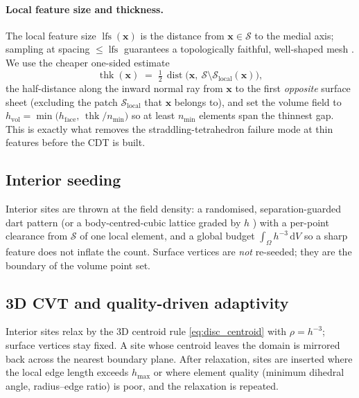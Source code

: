 \documentclass[11pt,a4paper]{article}
\numberwithin{equation}{section}
\newcommand{\vv}[1]{\mathbf{#1}}
\newcommand{\dd}{\,\mathrm{d}}
\DeclareMathOperator{\dist}{dist}
\begin{document}
\paragraph{Local feature size and thickness.}
The local feature size $\operatorname{lfs}(\vv{x})$ is the distance from
$\vv{x}\in\mathcal{S}$ to the medial axis; sampling at spacing
$\le\operatorname{lfs}$ guarantees a topologically faithful, well-shaped mesh
\cite{BoissonnatOudot2005}. We use the cheaper one-sided estimate
\begin{equation}
\label{eq:thickness}
\operatorname{thk}(\vv{x}) \;=\; \tfrac12\,\dist\!\bigl(\vv{x},\ \mathcal{S}\!
   \setminus\!\mathcal{S}_{\text{local}}(\vv{x})\bigr),
\end{equation}
the half-distance along the inward normal ray from $\vv{x}$ to the first
\emph{opposite} surface sheet (excluding the patch $\mathcal{S}_{\text{local}}$
that $\vv{x}$ belongs to), and set the volume field to
$h_{\text{vol}}=\min\!\bigl(h_{\text{face}},\,\operatorname{thk}/n_{\min}\bigr)$
so at least $n_{\min}$ elements span the thinnest gap. This is exactly what
removes the straddling-tetrahedron failure mode at thin features before the CDT
is built.

\subsection{Interior seeding}
Interior sites are thrown at the field density: a randomised, separation-guarded
dart pattern (or a body-centred-cubic lattice graded by $h$
\cite{LabelleShewchuk2007}) with a per-point clearance from $\mathcal{S}$ of one
local element, and a global budget $\int_\Omega h^{-3}\dd V$ so a sharp feature
does not inflate the count. Surface vertices are \emph{not} re-seeded; they are
the boundary of the volume point set.

\subsection{3D CVT and quality-driven adaptivity}
Interior sites relax by the 3D centroid rule \eqref{eq:disc_centroid} with
$\rho=h^{-3}$; surface vertices stay fixed. A site whose centroid leaves the
domain is mirrored back across the nearest boundary plane. After relaxation,
sites are inserted where the local edge length exceeds $h_{\max}$ or where
element quality (minimum dihedral angle, radius--edge ratio) is poor, and the
relaxation is repeated.
\end{document}
